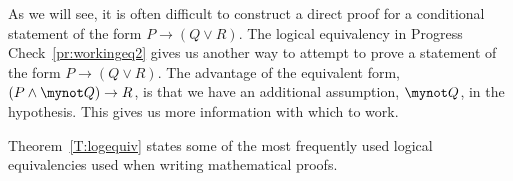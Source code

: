 
As we will see, it is often difficult to construct a direct proof for a conditional statement of the form $P \to \left( {Q \vee R} \right)$.  The logical equivalency in Progress Check~\ref{pr:workingeq2} gives us another way to attempt to prove a statement of the form  \linebreak
$P \to \left( {Q \vee R} \right)$.  The advantage of the equivalent form,  
$\left( {P \wedge \mynot  Q} \right) \to R$, 
is that we have an additional assumption, $\mynot  Q$,  in the hypothesis.  This gives us more information with which to work.


Theorem~\ref{T:logequiv} states some of the most frequently used logical equivalencies used when writing mathematical proofs.  

